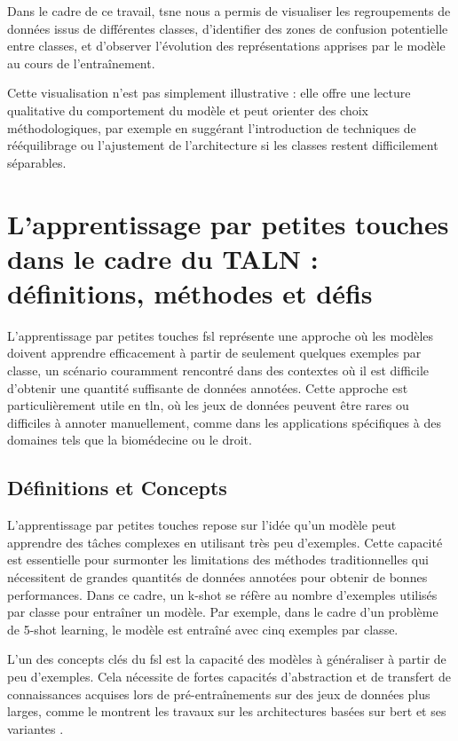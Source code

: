 \documentclass[12pt]{report}
\begin{document}
Dans le cadre de ce travail, \gls{tsne} nous a permis de visualiser les regroupements de données issus de différentes classes, d'identifier des zones de confusion potentielle entre classes, et d'observer l'évolution des représentations apprises par le modèle au cours de l'entraînement.

Cette visualisation n’est pas simplement illustrative : elle offre une lecture qualitative du comportement du modèle et peut orienter des choix méthodologiques, par exemple en suggérant l’introduction de techniques de rééquilibrage ou l’ajustement de l’architecture si les classes restent difficilement séparables.

\section{L'apprentissage par petites touches dans le cadre du TALN : définitions, méthodes et défis}

L'apprentissage par petites touches \gls{fsl} représente une approche où les modèles doivent apprendre efficacement à partir de seulement quelques exemples par classe, un scénario couramment rencontré dans des contextes où il est difficile d'obtenir une quantité suffisante de données annotées. Cette approche est particulièrement utile en \gls{tln}, où les jeux de données peuvent être rares ou difficiles à annoter manuellement, comme dans les applications spécifiques à des domaines tels que la biomédecine ou le droit.

\subsection{Définitions et Concepts}

L'apprentissage par petites touches repose sur l'idée qu'un modèle peut apprendre des tâches complexes en utilisant très peu d'exemples. Cette capacité est essentielle pour surmonter les limitations des méthodes traditionnelles qui nécessitent de grandes quantités de données annotées pour obtenir de bonnes performances. Dans ce cadre, un k-shot se réfère au nombre d'exemples utilisés par classe pour entraîner un modèle. Par exemple, dans le cadre d'un problème de 5-shot learning, le modèle est entraîné avec cinq exemples par classe.

L'un des concepts clés du \gls{fsl} est la capacité des modèles à généraliser à partir de peu d'exemples. Cela nécessite de fortes capacités d'abstraction et de transfert de connaissances acquises lors de pré-entraînements sur des jeux de données plus larges, comme le montrent les travaux sur les architectures basées sur \gls{bert} et ses variantes \cite{devlin2019bert, lee2020biobert, lu2020pubmedbert}.
\end{document}
